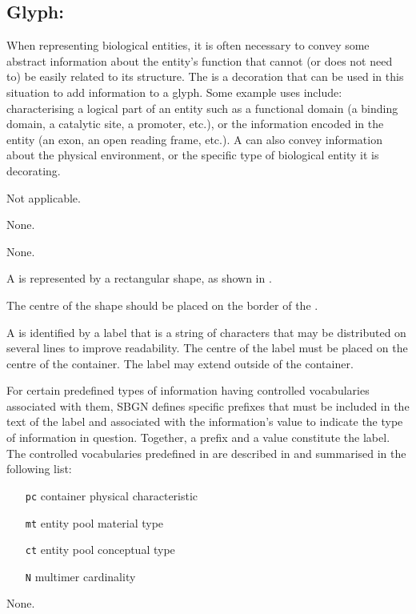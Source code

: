 \subsection{Glyph: }
\label{sec:unitInfo}

When representing biological entities, it is often necessary to convey some abstract information about the entity's function that cannot (or does not need to) be easily related to its structure.
The  is a decoration that can be used in this situation to add information to a glyph.
Some example uses include: characterising a logical part of an entity such as a functional domain (a binding domain, a catalytic site, a promoter, etc.), or the information encoded in the entity (an exon, an open reading frame, etc.).
A  can also convey information about the physical environment, or the specific type of biological entity it is decorating.

\begin{glyphDescription}

\glyphSboTerm
Not applicable.

\glyphIncoming
None.

\glyphOutgoing
None.

\glyphContainer
A  is represented by a rectangular shape, as shown in .

The centre of the shape should be placed on the border of the .

\glyphLabel
A  is identified by a label that is  a string of characters that may be distributed on several lines to improve readability.
The centre of the label must be placed on the centre of the container.
The label may extend outside of the container.
  
For certain predefined types of information having controlled vocabularies associated with them, SBGN defines specific prefixes that must be included in the text of the label and associated with the information's value to indicate the type of information in question. Together, a prefix and a value constitute the label. The controlled vocabularies predefined in \SBGNPDLone are described in  and summarised in the following list:

\begin{center}
  \begin{itemize}\setlength{\parskip}{0ex}
  \item[\texttt{pc}] container physical characteristic
  \item[\texttt{mt}] entity pool material type
  \item[\texttt{ct}] entity pool conceptual type
  \item[\texttt{N}]  multimer cardinality
  \end{itemize}
  
\end{center}

\glyphAux
None.

\end{glyphDescription}

